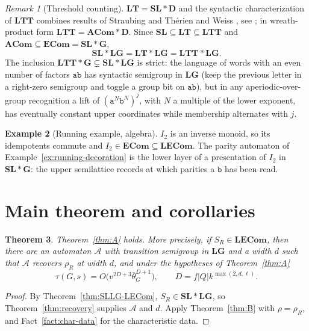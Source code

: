 \documentclass[11pt]{article}
\numberwithin{equation}{section}
\theoremstyle{plain}
\newtheorem{theorem}{Theorem}[section]
\theoremstyle{definition}
\newtheorem{example}[theorem]{Example}
\theoremstyle{remark}
\newtheorem{remark}[theorem]{Remark}
\theoremstyle{plain}
\newcommand{\LG}{\mathbf{LG}}
\newcommand{\SL}{\mathbf{SL}}
\newcommand{\Gp}{\mathbf{G}}
\newcommand{\Dd}{\mathbf{D}}
\newcommand{\ECom}{\mathbf{ECom}}
\newcommand{\LECom}{\mathbf{L}\mathbf{ECom}}
\newcommand{\LT}{\mathbf{LT}}
\newcommand{\LTT}{\mathbf{LTT}}
\newcommand{\ACom}{\mathbf{ACom}}
\newcommand{\bth}{\bar\theta}
\begin{document}
\begin{remark}[Threshold counting]
\label{rem:LTT}
$\LT=\SL*\Dd$ \cite{BrzozowskiSimon1973,McNaughton1974,Straubing1985} and the
syntactic characterization of $\LTT$ combines results of Straubing
\cite{Straubing1985} and Th\'erien and Weiss \cite{TherienWeiss1985}, see
\cite{BeauquierPin1991}; in wreath-product form $\LTT=\ACom*\Dd$.  Since
$\SL\subseteq\LT\subseteq\LTT$ and $\ACom\subseteq\ECom=\SL*\Gp$,
\[
  \SL*\LG=\LT*\LG=\LTT*\LG .
\]
The inclusion $\LTT*\Gp\subsetneq\SL*\LG$ is strict: the language of words with an
even number of factors $\mathtt{ab}$ has syntactic semigroup in $\LG$ (keep the
previous letter in a right-zero semigroup and toggle a group bit on $\mathtt{ab}$),
but in any aperiodic-over-group recognition a lift of $(\mathtt a^N\mathtt
b^N)^j$, with $N$ a multiple of the lower exponent, has eventually constant upper
coordinates while membership alternates with $j$.
\end{remark}

\begin{example}[Running example, algebra]
\label{ex:running-algebra}
$I_2$ is an inverse monoid, so its idempotents commute and $I_2\in\ECom\subseteq
\LECom$.  The parity automaton of Example~\ref{ex:running-decoration} is the
lower layer of a presentation of $I_2$ in $\SL*\Gp$: the upper semilattice
records at which parities a $\mathtt b$ has been read.
\end{example}

\section{Main theorem and corollaries}
\label{sec:main}

\begin{theorem}
\label{thm:main}
Theorem~\ref{thm:A} holds.  More precisely, if $S_R\in\LECom$, then there are an
automaton $\mathcal A$ with transition semigroup in $\LG$ and a width $d$ such
that $\mathcal A$ recovers $\rho_R$ at width $d$, and under the hypotheses of
Theorem~\ref{thm:A}
\[
  \tau(G,s)=O\bigl(v^{2D+3}\bth_G^{D+1}\bigr),\qquad D=f|Q|k^{\max(2,d,\ell)} .
\]
\end{theorem}

\begin{proof}
By Theorem~\ref{thm:SLLG-LECom}, $S_R\in\SL*\LG$, so Theorem~\ref{thm:recovery}
supplies $\mathcal A$ and $d$.  Apply Theorem~\ref{thm:B} with $\rho=\rho_R$, and
Fact~\ref{fact:char-data} for the characteristic data.
\end{proof}
\end{document}
